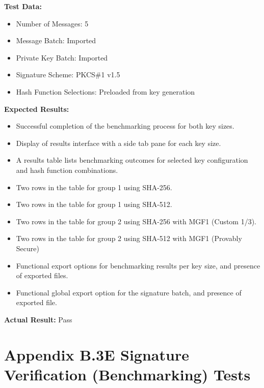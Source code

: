 \documentclass[]{final_report}
\theoremstyle{definition}
\begin{document}
\textbf{Test Data:}
\begin{itemize}
    \item Number of Messages: 5
    \item Message Batch: Imported
    \item Private Key Batch: Imported
    \item Signature Scheme: PKCS\#1 v1.5
    \item Hash Function Selections: Preloaded from key generation
\end{itemize}

\textbf{Expected Results:}
\begin{itemize}
    \item Successful completion of the benchmarking process for both key sizes.
    \item Display of results interface with a side tab pane for each key size.
    \item A results table lists benchmarking outcomes for selected key configuration and hash function combinations.
    \item Two rows in the table for group 1 using SHA-256.
    \item Two rows in the table for group 1 using SHA-512.
    \item Two rows in the table for group 2 using SHA-256 with MGF1 (Custom 1/3).
    \item Two rows in the table for group 2 using SHA-512 with MGF1 (Provably Secure)
    \item Functional export options for benchmarking results per key size, and presence of exported files.
    \item Functional global export option for the signature batch, and presence of exported file.
\end{itemize}

\textbf{Actual Result:} Pass


\section{Appendix B.3E Signature Verification (Benchmarking) Tests}
\end{document}
